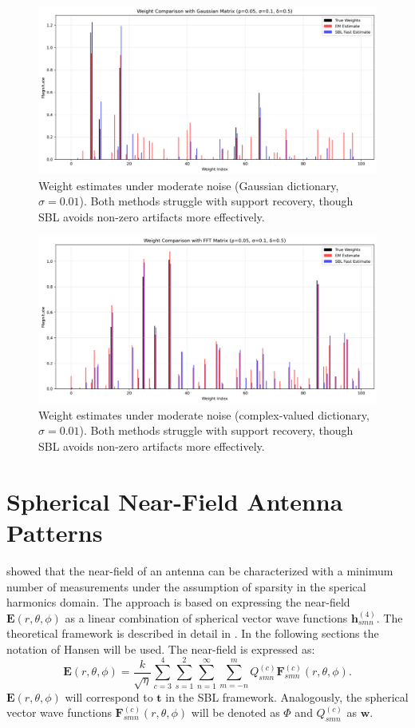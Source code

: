 \documentclass{article}
\begin{document}
\begin{figure}[H]
    \centering
    \includegraphics[width=0.75\linewidth]{Figures/weight_comparison_Gaussian_simga0.1.png}
    \caption{Weight estimates under moderate noise (Gaussian dictionary, $\sigma=0.01$). Both methods struggle with support recovery, though SBL avoids non-zero artifacts more effectively.}
    \label{fig:weight001Gauss}
\end{figure}
\begin{figure}[H]
    \centering
    \includegraphics[width=0.75\linewidth]{Figures/weight_comparison_FFT_simga0.1.png}
    \caption{Weight estimates under moderate noise (complex-valued dictionary, $\sigma=0.01$). Both methods struggle with support recovery, though SBL avoids non-zero artifacts more effectively.}
    \label{fig:weight001FFT}
\end{figure}

\section{Spherical Near-Field Antenna Patterns}
\citet{Hofmann2019minimum} showed that the near-field of an antenna can be characterized with a minimum number of measurements under the assumption of sparsity in the sperical harmonics domain. The approach is based on expressing the near-field \(\mathbf{E}(r,\theta,\phi)\) as a linear combination of spherical vector wave functions \(\mathbf{h}_{smn}^{(4)}\). The theoretical framework is described in detail in \citet{hansen1988spherical}. In the following sections the notation of Hansen will be used. The near-field is expressed as:
\begin{equation}
    \label{eq:hansenEfield}
    \mathbf{E}(r,\theta,\phi) = \frac{k}{\sqrt{\eta}}\sum_{c=3}^4\sum_{s=1}^2 \sum_{n=1}^\infty \sum_{m=-n}^m Q_{smn}^{(c)} \mathbf{F}_{smn}^{(c)}(r,\theta,\phi).
\end{equation}
\(\mathbf{E}(r,\theta,\phi)\) will correspond to \(\mathbf{t}\) in the SBL framework. Analogously, the spherical vector wave functions \(\mathbf{F}_{smn}^{(c)}(r,\theta,\phi)\) will be denoted as \(\Phi\) and \(Q_{smn}^{(c)}\) as \(\mathbf{w}\).
\end{document}
